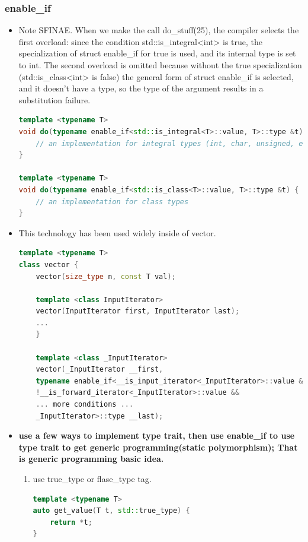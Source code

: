 \documentclass[a4paper,11pt,twoside]{book}
\begin{document}
\subsubsection{enable\_if}
\begin{itemize}
	
	\item Note SFINAE. When we make the call do\_stuff(25), the compiler selects the first overload: since the condition std::is\_integral<int> is true, the specialization of struct enable\_if for true is used, and its internal type is set to int. The second overload is omitted because without the true specialization (std::is\_class<int> is false) the general form of struct enable\_if is selected, and it doesn't have a type, so the type of the argument results in a substitution failure.
	
\begin{lstlisting}[frame=single, language=c++]
template <typename T>
void do(typename enable_if<std::is_integral<T>::value, T>::type &t){
	// an implementation for integral types (int, char, unsigned, etc.)
}
	
template <typename T>
void do(typename enable_if<std::is_class<T>::value, T>::type &t) {
	// an implementation for class types
}
\end{lstlisting}
	
	\item This technology has been used widely inside of vector.
\begin{lstlisting}[frame=single, language=c++]
template <typename T>
class vector {
	vector(size_type n, const T val);
	
	template <class InputIterator>
	vector(InputIterator first, InputIterator last);
	...
	}
	
	template <class _InputIterator>
	vector(_InputIterator __first,
	typename enable_if<__is_input_iterator<_InputIterator>::value &&
	!__is_forward_iterator<_InputIterator>::value &&
	... more conditions ...
	_InputIterator>::type __last);
\end{lstlisting}
	

	\item \textbf{use a few ways to implement type trait, then use enable\_if to use type trait to get generic programming(static polymorphism); That is generic programming basic idea.}


\begin{enumerate}
	\item use true\_type or flase\_type tag.
\begin{lstlisting}[frame=single, language=c++]
template <typename T>
auto get_value(T t, std::true_type) {
	return *t;
}


\end{lstlisting}
\end{enumerate}
\end{itemize}
\end{document}
